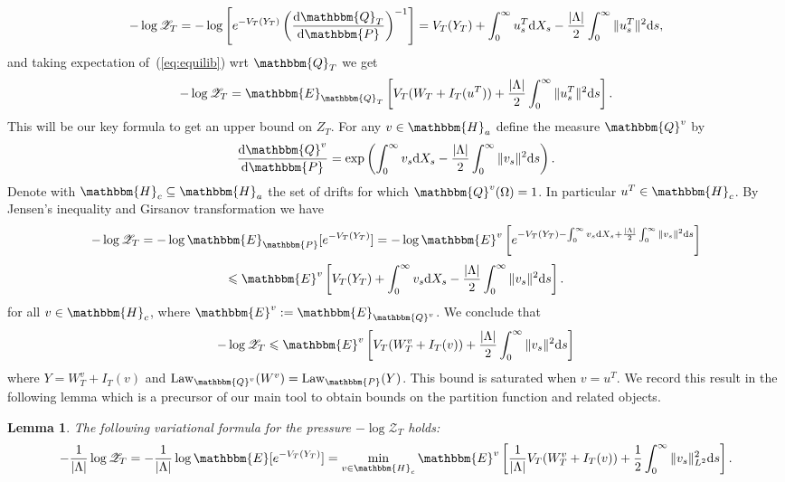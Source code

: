 \documentclass[11pt, oneside]{article}   	%
\newcommand{\assign}{:=}
\newcommand{\mathd}{\mathrm{d}}
\newcommand{\tmop}[1]{\ensuremath{\operatorname{#1}}}
\newtheorem{lemma}{Lemma}
\newcommand{\CZ}{\mathscr{Z}}
\begin{document}
\begin{equation}
  - \log \CZ_T = - \log \left[ e^{- V_T (Y_T)} \left( \frac{\mathd
  \mathbbm{Q}_T}{\mathd \mathbbm{P}} \right)^{- 1} \right] = V_T (Y_T) +
  \int_0^{\infty} u_s^T \mathd X_s - \frac{| \Lambda |}{2} \int_0^{\infty} \|
  u_s^T \|^2 \mathd s, \label{eq:equilib}
\end{equation}
and taking expectation of~(\ref{eq:equilib}) wrt $\mathbbm{Q}_T$ we get
\begin{equation}
  - \log \CZ_T =\mathbbm{E}_{\mathbbm{Q}_T} \left[ V_T (W_T + I_T (u^T)) +
  \frac{| \Lambda |}{2} \int_0^{\infty} \| u_s^T \|^2 \mathd s \right] .
  \label{eq:pressure}
\end{equation}
This will be our key formula to get an upper bound on $Z_T$. For any $v \in
\mathbbm{H}_a$ define the measure $\mathbbm{Q}^v$ by
\[ \frac{\mathd \mathbbm{Q}^v}{\mathd \mathbbm{P}} = \exp \left(
   \int_0^{\infty} v_s \mathd X_s - \frac{| \Lambda |}{2} \int_0^{\infty} \|
   v_s \|^2 \mathd s \right) . \]
Denote with $\mathbbm{H}_c \subseteq \mathbbm{H}_a$ the set of drifts for
which $\mathbbm{Q}^v (\Omega) = 1$. In particular $u^T \in \mathbbm{H}_c$. By
Jensen's inequality and Girsanov transformation we have
\[ - \log \CZ_T = - \log \mathbbm{E}_{\mathbbm{P}} [e^{- V_T (Y_T)}] = - \log
   \mathbbm{E}^v \left[ e^{- V_T (Y_T) - \int_0^{\infty} v_s \mathd X_s +
   \frac{| \Lambda |}{2} \int_0^{\infty} \| v_s \|^2 \mathd s} \right] \]
\[ \leqslant \mathbbm{E}^v \left[ V_T (Y_T) + \int_0^{\infty} v_s \mathd X_s -
   \frac{| \Lambda |}{2} \int_0^{\infty} \| v_s \|^2 \mathd s \right] . \]
for all $v \in \mathbbm{H}_c$, where $\mathbbm{E}^v \assign
\mathbbm{E}_{\mathbbm{Q}^v}$. We conclude that
\begin{equation}
  - \log \CZ_T \leqslant \mathbbm{E}^v \left[ V_T (W^v_T + I_T (v)) + \frac{|
  \Lambda |}{2} \int_0^{\infty} \| v_s \|^2 \mathd s \right]
  \label{eq:pressure-bound}
\end{equation}
where $Y = W^v_T + I_T (v)$ and $\tmop{Law}_{\mathbbm{Q}^v} (W^v) =
\tmop{Law}_{\mathbbm{P}} (Y)$. This bound is saturated when $v = u^T$. We
record this result in the following lemma which is a precursor of our main
tool to obtain bounds on the partition function and related objects.

\begin{lemma}
  \label{lemma:variational-easy}The following variational formula for the
  pressure $- \log \CZ_T$ holds:
  \[ - \frac{1}{| \Lambda |} \log \CZ_T = - \frac{1}{| \Lambda |} \log
     \mathbbm{E} [e^{- V_T (Y_T)}] = \min_{v \in \mathbbm{H}_c} \mathbbm{E}^v
     \left[ \frac{1}{| \Lambda |} V_T (W^v_T + I_T (v)) + \frac{1}{2}
     \int_0^{\infty} \| v_s \|^2_{L^2} \mathd s \right] . \]
\end{lemma}
\end{document}
